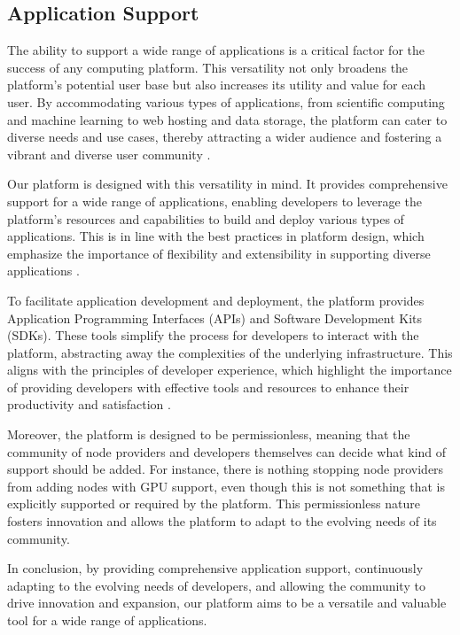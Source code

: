 \subsection{Application Support}
\label{sec:application_support}

The ability to support a wide range of applications is a critical factor for the success of any computing platform. This versatility not only broadens the platform's potential user base but also increases its utility and value for each user. By accommodating various types of applications, from scientific computing and machine learning to web hosting and data storage, the platform can cater to diverse needs and use cases, thereby attracting a wider audience and fostering a vibrant and diverse user community \cite{gawer2002platform}.

Our platform is designed with this versatility in mind. It provides comprehensive support for a wide range of applications, enabling developers to leverage the platform's resources and capabilities to build and deploy various types of applications. This is in line with the best practices in platform design, which emphasize the importance of flexibility and extensibility in supporting diverse applications \cite{meyer1997power}.

To facilitate application development and deployment, the platform provides Application Programming Interfaces (APIs) and Software Development Kits (SDKs). These tools simplify the process for developers to interact with the platform, abstracting away the complexities of the underlying infrastructure. This aligns with the principles of developer experience, which highlight the importance of providing developers with effective tools and resources to enhance their productivity and satisfaction \cite{ko2006exploratory}.

Moreover, the platform is designed to be permissionless, meaning that the community of node providers and developers themselves can decide what kind of support should be added. For instance, there is nothing stopping node providers from adding nodes with GPU support, even though this is not something that is explicitly supported or required by the platform. This permissionless nature fosters innovation and allows the platform to adapt to the evolving needs of its community.

In conclusion, by providing comprehensive application support, continuously adapting to the evolving needs of developers, and allowing the community to drive innovation and expansion, our platform aims to be a versatile and valuable tool for a wide range of applications.
